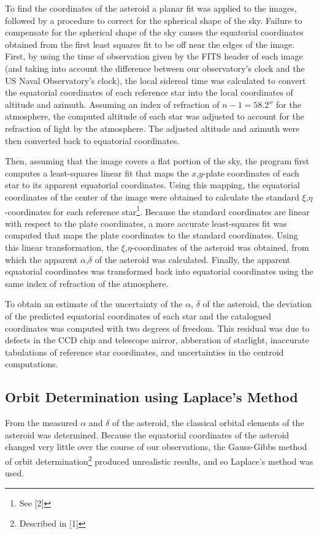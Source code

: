 \documentclass[12pt,journal,compsoc]{IEEEtran}
\begin{document}
To find the coordinates of the asteroid a planar fit was applied to the images, followed by a procedure to correct for the spherical shape of the sky.
Failure to compensate for the spherical shape of the sky causes the equatorial coordinates obtained from the first least squares fit to be off near the edges of the image.
First, by using the time of observation given by the FITS header of each image (and taking into account the difference between our observatory's clock and the US Naval Observatory's clock), the local sidereal time was calculated to convert the equatorial coordinates of each reference star into the local coordinates of altitude and azimuth.
Assuming an index of refraction of $n-1=58.2''$ for the atmosphere, the computed altitude of each star was adjusted to account for the refraction of light by the atmosphere.
The adjusted altitude and azimuth were then converted back to equatorial coordinates.

Then, assuming that the image covers a flat portion of the sky, the program first computes a least-squares linear fit that maps the $x$,$y$-plate coordinates of each star to its apparent equatorial coordinates.
Using this mapping, the equatorial coordinates of the center of the image were obtained to calculate the standard $\xi$,$\eta$-coordinates for each reference star\footnote{See [2]}. Because the standard coordinates are linear with respect to the plate coordinates, a more accurate least-squares fit was computed that maps the plate coordinates to the standard coordinates. 
Using this linear transformation, the $\xi$,$\eta$-coordinates of the asteroid was obtained, from which the apparent $\alpha$,$\delta$ of the asteroid was calculated.
Finally, the apparent equatorial coordinates was transformed back into equatorial coordinates using the same index of refraction of the atmosphere.

To obtain an estimate of the uncertainty of the $\alpha$, $\delta$ of the asteroid, the deviation of the predicted equatorial coordinates of each star and the catalogued coordinates was computed with two degrees of freedom.
This residual was due to defects in the CCD chip and telescope mirror, abberation of starlight, inaccurate tabulations of reference star coordinates, and uncertainties in the centroid computations.

\subsection{Orbit Determination using Laplace's Method}
From the measured $\alpha$ and $\delta$ of the asteroid, the classical orbital elements of the asteroid was determined. Because the equatorial coordinates of the asteroid changed very little
over the course of our observations, the Gauss-Gibbs method of orbit determination\footnote{Described in [1]} produced unrealistic results, and so Laplace's method was used. 
\end{document}
